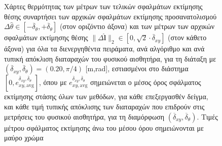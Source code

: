 \begin{figure}\vspace{1cm}\hspace{0.5cm}
  
  \vspace{1cm}
  \caption{\small Χάρτες θερμότητας των μέτρων των τελικών σφαλμάτων εκτίμησης
           θέσης συναρτήσει των αρχικών σφαλμάτων εκτίμησης προσανατολισμού
           $\Delta\hat{\theta} \in
           [-\overline{\delta}_{\theta},+\overline{\delta}_{\theta}]$ (στον
           οριζόντιο άξονα) και των μέτρων των αρχικών σφαλμάτων εκτίμησης
           θέσης $\|\Delta \hat{\bm{l}}\|_2 \in [0, \sqrt{2}\cdot
           \overline{\delta}_{xy}]$ (στον κάθετο άξονα) για όλα τα
           διενεργηθέντα πειράματα, ανά αλγόριθμο και ανά τυπική απόκλιση
           διαταραχών του φυσικού αισθητήρα, για τη διάταξη με
           $(\overline{\delta}_{xy}, \overline{\delta}_{\theta}) = (0.20,
           \pi/4)$ [m,rad], εστιασμένοι στο διάστημα $[0,
           e_{xy,\text{avg}}^{\overline{\delta}_{xy},
           \overline{\delta}_{\theta}}]$, όπου με
           $e_{xy,\text{avg}}^{\overline{\delta}_{xy},
           \overline{\delta}_{\theta}}$ σημειώνεται ο μέσος όρος σφάλματος
           εκτίμησης στάσης όλων των μεθόδων, για κάθε επεξεργασθέν δείγμα, και
           κάθε τιμή τυπικής απόκλισης των διαταραχών που επιδρούν στις
           μετρήσεις του φυσικού αισθητήρα, για τη διαμόρφωση
           $(\overline{\delta}_{xy}, \overline{\delta}_{\theta})$.  Τιμές
           μέτρου σφάλματος εκτίμησης άνω του μέσου όρου σημειώνονται με μαύρο
           χρώμα}
  \label{fig:02_05_03:02:06}
\end{figure}


